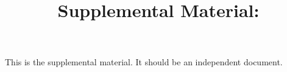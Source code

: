 \title[\maintitle]{Supplemental Material: \fulltitle}
\authorlist\renewcommand{\shortauthors}{\authorabbr}
\maketitle

This is the supplemental material. It should be an independent document.